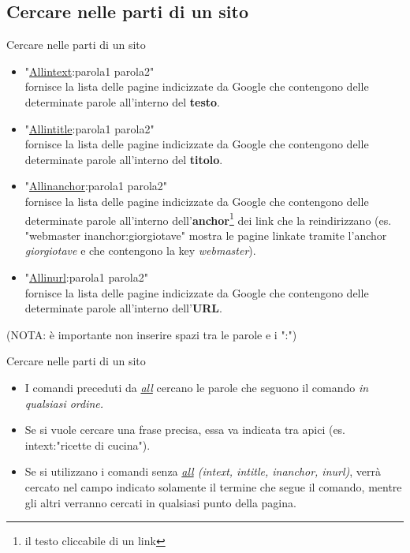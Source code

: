 \documentclass{beamer}
\begin{document}
\subsection{Cercare nelle parti di un sito}
\begin{frame}{Cercare nelle parti di un sito}
\footnotesize
\begin{itemize}
\item "\underline{Allintext}:parola1 parola2"\\fornisce la lista delle pagine indicizzate da Google che contengono delle determinate parole all'interno del \textbf{testo}.
\item "\underline{Allintitle}:parola1 parola2"\\fornisce la lista delle pagine indicizzate da Google che contengono delle determinate parole all'interno del \textbf{titolo}.
\item "\underline{Allinanchor}:parola1 parola2"\\fornisce la lista delle pagine indicizzate da Google che contengono delle determinate parole all'interno dell'\textbf{anchor}\footnote{il testo cliccabile di un link} dei link che la reindirizzano (es. "webmaster inanchor:giorgiotave" mostra le pagine linkate tramite l'anchor \textit{giorgiotave} e che contengono la key \textit{webmaster}).
\item "\underline{Allinurl}:parola1 parola2"\\fornisce la lista delle pagine indicizzate da Google che contengono delle determinate parole all'interno dell'\textbf{URL}.
\end{itemize}
(NOTA: è importante non inserire spazi tra le parole e i ":")
\end{frame}
\begin{frame}{Cercare nelle parti di un sito}
\begin{itemize}
\item I comandi preceduti da \textit{\underline{all}} cercano le parole che seguono il comando \textit{in qualsiasi ordine.}
\item Se si vuole cercare una frase precisa, essa va indicata tra apici (es. intext:"ricette di cucina").
\item Se si utilizzano i comandi senza \textit{\underline{all} (intext, intitle, inanchor, inurl)}, verrà cercato nel campo indicato solamente il termine che segue il comando, mentre gli altri verranno cercati in qualsiasi punto della pagina.
\end{itemize}
\end{frame}
\end{document}
